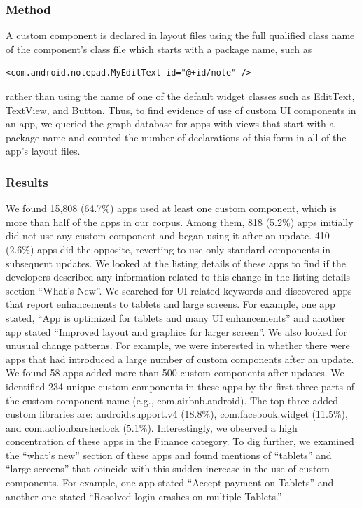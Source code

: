 \subsubsection{Method}
A custom component is declared in layout files using the full qualified class name of the component's class file which starts with a package name, such as
\begin{verbatim}
<com.android.notepad.MyEditText id="@+id/note" />
\end{verbatim}
rather than using the name of one of the default widget classes such as EditText, TextView, and Button.
Thus, to find evidence of use of custom UI components in an app, we queried the graph database for apps with views that start with a package name and counted the number of declarations of this form in all of the app's layout files.

\subsubsection{Results}

We found 15,808 (64.7\%) apps used at least one custom component, which is more than half of the apps in our corpus. 
Among them, 818 (5.2\%) apps initially did not use any custom component and began using it after an update. 
410 (2.6\%) apps did the opposite, reverting to use only standard components in subsequent updates. 
We looked at the listing details of these apps to find if the developers described any information related to this change in the listing details section ``What's New''.
We searched for UI related keywords and discovered apps that report enhancements to tablets and large screens.
For example, one app stated, ``App is optimized for tablets and many UI enhancements'' and another app stated ``Improved layout and graphics for larger screen''.
We also looked for unusual change patterns.
For example, we were interested in whether there were apps that had introduced a large number of custom components after an update.
We found 58 apps added more than 500 custom components after updates. 
We identified  234 unique custom components in these apps by the first three parts of the custom component name (e.g., com.airbnb.android).
The top three added custom libraries are: android.support.v4 (18.8\%), com.facebook.widget (11.5\%), and com.actionbarsherlock (5.1\%).
Interestingly, we observed a high concentration of these apps in the Finance category.
To dig further, we examined the ``what's new'' section of these apps and found mentions of ``tablets'' and ``large screens'' that coincide with this sudden increase in the use of custom components.
For example, one app stated ``Accept payment on Tablets'' and another one stated ``Resolved login crashes on multiple Tablets.''

